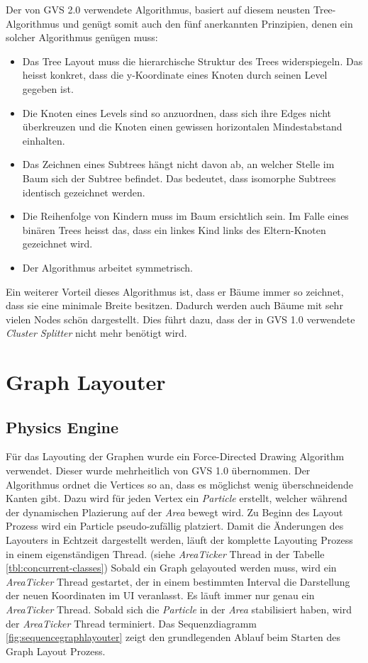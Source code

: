\documentclass[11pt,a4paper,english,oneside]{book}
\numberwithin{equation}{chapter}
\begin{document}
	Der von GVS 2.0 verwendete Algorithmus, basiert auf diesem neusten Tree-Algorithmus und genügt somit auch den fünf anerkannten Prinzipien, denen ein solcher Algorithmus genügen muss:
	
	\begin{itemize}
		\item Das Tree Layout muss die hierarchische Struktur des Trees widerspiegeln. Das heisst konkret, dass die y-Koordinate eines Knoten durch seinen Level gegeben ist.
		\item Die Knoten eines Levels sind so anzuordnen, dass sich ihre Edges nicht überkreuzen und die Knoten einen gewissen horizontalen Mindestabstand einhalten.
		\item Das Zeichnen eines Subtrees hängt nicht davon ab, an welcher Stelle im Baum sich der Subtree befindet. Das bedeutet, dass isomorphe Subtrees identisch gezeichnet werden.
		\item Die Reihenfolge von Kindern muss im Baum ersichtlich sein. Im Falle eines binären Trees heisst das, dass ein linkes Kind links des Eltern-Knoten gezeichnet wird.
		\item Der Algorithmus arbeitet symmetrisch.
	\end{itemize}
	
	Ein weiterer Vorteil dieses Algorithmus ist, dass er Bäume immer so zeichnet, dass sie eine minimale Breite besitzen. Dadurch werden auch Bäume mit sehr vielen Nodes schön dargestellt. Dies führt dazu, dass der in GVS 1.0 \cite{gvs1} verwendete \textit{Cluster Splitter} nicht mehr benötigt wird. 
	
	\section{Graph Layouter}
	
	\subsection{Physics Engine} \label{ssec:graphlayouter}
	Für das Layouting der Graphen wurde ein Force-Directed Drawing Algorithm verwendet. Dieser wurde mehrheitlich von GVS 1.0 übernommen. Der Algorithmus ordnet die Vertices so an, dass es möglichst wenig überschneidende Kanten gibt. Dazu wird für jeden Vertex ein \textit{Particle} erstellt, welcher während der dynamischen Plazierung auf der \textit{Area} bewegt wird. Zu Beginn des Layout Prozess wird ein Particle pseudo-zufällig platziert. Damit die Änderungen des Layouters in Echtzeit dargestellt werden, läuft der komplette Layouting Prozess in einem eigenständigen Thread. (siehe \textit{AreaTicker} Thread in der Tabelle \ref{tbl:concurrent-classes}) Sobald ein Graph gelayouted werden muss, wird ein \textit{AreaTicker} Thread gestartet, der in einem bestimmten Interval die Darstellung der neuen Koordinaten im UI veranlasst. Es läuft immer nur genau ein \textit{AreaTicker} Thread. Sobald sich die \textit{Particle} in der \textit{Area} stabilisiert haben, wird der \textit{AreaTicker} Thread terminiert. Das Sequenzdiagramm \ref{fig:sequencegraphlayouter} zeigt den grundlegenden Ablauf beim Starten des Graph Layout Prozess.
	
\end{document}
